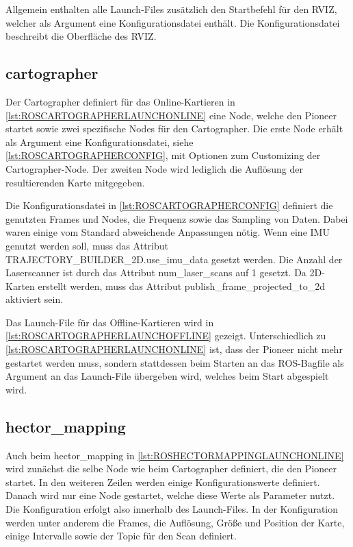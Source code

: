 Allgemein enthalten alle Launch-Files zusätzlich den Startbefehl für den RVIZ, welcher als Argument eine Konfigurationsdatei enthält. Die Konfigurationsdatei beschreibt die Oberfläche des RVIZ.

\subsection{cartographer}

Der Cartographer definiert für das Online-Kartieren in \autoref{lst:ROSCARTOGRAPHERLAUNCHONLINE} eine Node, welche den Pioneer startet sowie zwei spezifische Nodes für den Cartographer. Die erste Node erhält als Argument eine Konfigurationsdatei, siehe \autoref{lst:ROSCARTOGRAPHERCONFIG}, mit Optionen zum Customizing der Cartographer-Node. Der zweiten Node wird lediglich die Auflösung der resultierenden Karte mitgegeben.

Die Konfigurationsdatei in \autoref{lst:ROSCARTOGRAPHERCONFIG} definiert die genutzten Frames und Nodes, die Frequenz sowie das Sampling von Daten. Dabei waren einige vom Standard abweichende Anpassungen nötig. Wenn eine IMU genutzt werden soll, muss das Attribut TRAJECTORY\_BUILDER\_2D.use\_imu\_data gesetzt werden. Die Anzahl der Laserscanner ist durch das Attribut num\_laser\_scans auf 1 gesetzt. Da 2D-Karten erstellt werden, muss das Attribut publish\_frame\_projected\_to\_2d aktiviert sein.

Das Launch-File für das Offline-Kartieren wird in \autoref{lst:ROSCARTOGRAPHERLAUNCHOFFLINE} gezeigt. Unterschiedlich zu \autoref{lst:ROSCARTOGRAPHERLAUNCHONLINE} ist, dass der Pioneer nicht mehr gestartet werden muss, sondern stattdessen beim Starten an das \ac{ROS}-Bagfile als Argument an das Launch-File übergeben wird, welches beim Start abgespielt wird.

\subsection{hector\_mapping}

Auch beim hector\_mapping in \autoref{lst:ROSHECTORMAPPINGLAUNCHONLINE} wird zunächst die selbe Node wie beim Cartographer definiert, die den Pioneer startet. In den weiteren Zeilen werden einige Konfigurationswerte definiert. Danach wird nur eine Node gestartet, welche diese Werte als Parameter nutzt. Die Konfiguration erfolgt also innerhalb des Launch-Files. In der Konfiguration werden unter anderem die Frames, die Auflösung, Größe und Position der Karte, einige Intervalle sowie der Topic für den Scan definiert.

